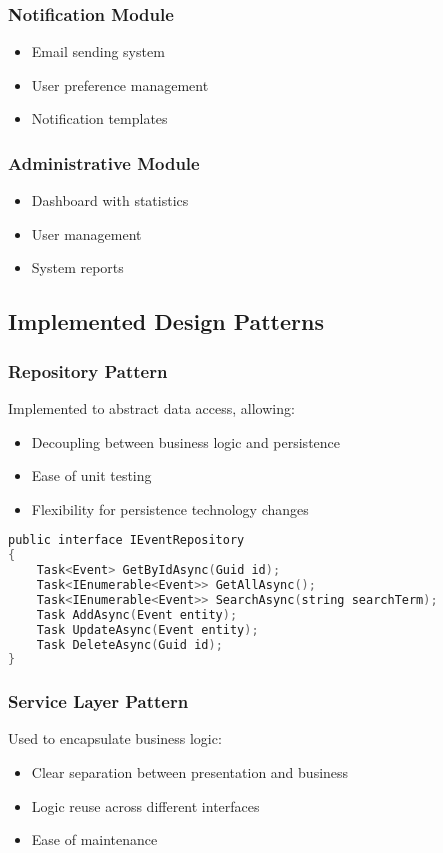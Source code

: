 \documentclass[12pt,a4paper]{article}
\begin{document}
\subsubsection{Notification Module}
\begin{itemize}
    \item Email sending system
    \item User preference management
    \item Notification templates
\end{itemize}

\subsubsection{Administrative Module}
\begin{itemize}
    \item Dashboard with statistics
    \item User management
    \item System reports
\end{itemize}

\subsection{Implemented Design Patterns}

\subsubsection{Repository Pattern}
Implemented to abstract data access, allowing:
\begin{itemize}
    \item Decoupling between business logic and persistence
    \item Ease of unit testing
    \item Flexibility for persistence technology changes
\end{itemize}

\begin{lstlisting}[language=C, caption=Repository Pattern Example]
public interface IEventRepository
{
    Task<Event> GetByIdAsync(Guid id);
    Task<IEnumerable<Event>> GetAllAsync();
    Task<IEnumerable<Event>> SearchAsync(string searchTerm);
    Task AddAsync(Event entity);
    Task UpdateAsync(Event entity);
    Task DeleteAsync(Guid id);
}
\end{lstlisting}

\subsubsection{Service Layer Pattern}
Used to encapsulate business logic:
\begin{itemize}
    \item Clear separation between presentation and business
    \item Logic reuse across different interfaces
    \item Ease of maintenance
\end{itemize}
\end{document}
